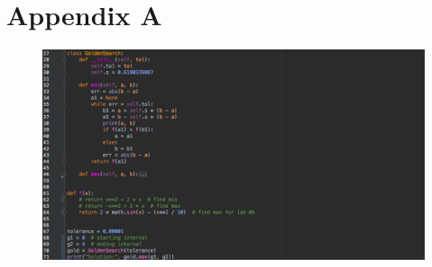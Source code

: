 \documentclass[12pt, letterpaper]{article}
\begin{document}
\pagebreak


\appendix
	\section{Appendix A}
            		\begin{figure}[htp]
            			\centering
            			\includegraphics[width=1.0\linewidth]{PythonCode.png}
            		\end{figure}
\end{document}
